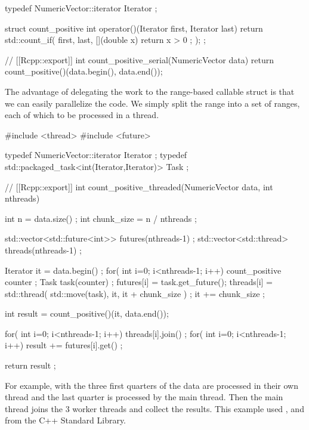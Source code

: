 \begin{example}
typedef NumericVector::iterator Iterator ;

struct count_positive {
  int operator()(Iterator first, Iterator last){
    return std::count_if( first, last, 
      [](double x){ return x > 0 ; } 
    );    
  }
} ;

// [[Rcpp::export]]
int count_positive_serial(NumericVector data){
  return count_positive()(data.begin(), data.end());
}
\end{example}

The advantage of delegating the work to the range-based callable 
 struct is that we can easily 
parallelize the code. We simply split the range into a set of ranges, 
each of which to be processed in a thread. 

\begin{example}
#include <thread>
#include <future>

typedef NumericVector::iterator Iterator ;
typedef std::packaged_task<int(Iterator,Iterator)> Task ;

// [[Rcpp::export]]
int count_positive_threaded(NumericVector data, int nthreads){
  int n = data.size() ;
  int chunk_size = n / nthreads ; 
  
  std::vector<std::future<int>> futures(nthreads-1) ;
  std::vector<std::thread> threads(nthreads-1) ;
  
  Iterator it = data.begin() ;
  for( int i=0; i<nthreads-1; i++){
    count_positive counter ;        
    Task task(counter) ;
    futures[i] = task.get_future();
    threads[i] = std::thread( std::move(task), it, it + chunk_size ) ;
    it += chunk_size ;
  }
  
  int result = count_positive()(it, data.end()); 
  
  for( int i=0; i<nthreads-1; i++){
    threads[i].join() ;
  }
  for( int i=0; i<nthreads-1; i++){
    result += futures[i].get() ;  
  }
                            
  return result ;
}
\end{example}

For example, with  the three first quarters of the data
are processed in their own thread and the last quarter is processed by the 
main thread. Then the main thread joins the 3 worker threads and collect
the results. This example used ,  and
 from the C++ Standard Library. 

